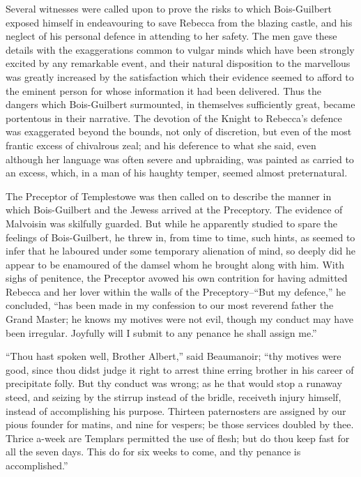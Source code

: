 Several witnesses were called upon to prove the risks to which
Bois-Guilbert exposed himself in endeavouring to save Rebecca from the
blazing castle, and his neglect of his personal defence in attending to
her safety. The men gave these details with the exaggerations common to
vulgar minds which have been strongly excited by any remarkable event,
and their natural disposition to the marvellous was greatly increased by
the satisfaction which their evidence seemed to afford to the eminent
person for whose information it had been delivered. Thus the dangers
which Bois-Guilbert surmounted, in themselves sufficiently great, became
portentous in their narrative. The devotion of the Knight to Rebecca's
defence was exaggerated beyond the bounds, not only of discretion, but
even of the most frantic excess of chivalrous zeal; and his deference to
what she said, even although her language was often severe and
upbraiding, was painted as carried to an excess, which, in a man of his
haughty temper, seemed almost preternatural.

The Preceptor of Templestowe was then called on to describe the manner
in which Bois-Guilbert and the Jewess arrived at the Preceptory. The
evidence of Malvoisin was skilfully guarded. But while he apparently
studied to spare the feelings of Bois-Guilbert, he threw in, from time
to time, such hints, as seemed to infer that he laboured under some
temporary alienation of mind, so deeply did he appear to be enamoured of
the damsel whom he brought along with him. With sighs of penitence, the
Preceptor avowed his own contrition for having admitted Rebecca and her
lover within the walls of the Preceptory--``But my defence,'' he
concluded, ``has been made in my confession to our most reverend father
the Grand Master; he knows my motives were not evil, though my conduct
may have been irregular. Joyfully will I submit to any penance he shall
assign me.''

``Thou hast spoken well, Brother Albert,'' said Beaumanoir; ``thy
motives were good, since thou didst judge it right to arrest thine
erring brother in his career of precipitate folly. But thy conduct was
wrong; as he that would stop a runaway steed, and seizing by the stirrup
instead of the bridle, receiveth injury himself, instead of
accomplishing his purpose. Thirteen paternosters are assigned by our
pious founder for matins, and nine for vespers; be those services
doubled by thee. Thrice a-week are Templars permitted the use of flesh;
but do thou keep fast for all the seven days. This do for six weeks to
come, and thy penance is accomplished.''

